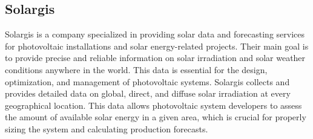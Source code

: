 \subsection{Solargis}
Solargis is a company specialized in providing solar data and forecasting services for photovoltaic
installations and solar energy-related projects. Their main goal is to provide precise and
reliable information on solar irradiation and solar weather conditions anywhere in the world.
This data is essential for the design, optimization, and management of photovoltaic systems.
Solargis collects and provides detailed data on global, direct, and diffuse solar irradiation at
every geographical location. This data allows photovoltaic system developers to assess the
amount of available solar energy in a given area, which is crucial for properly sizing the
system and calculating production forecasts.


